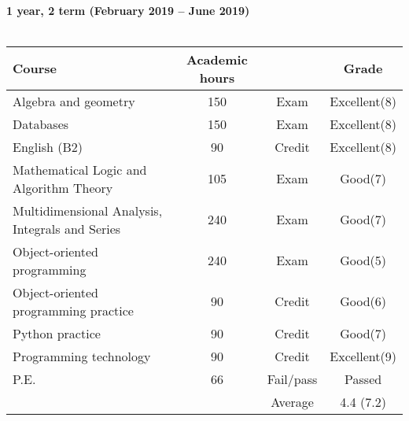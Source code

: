 \documentclass[11pt, a4paper]{report}
\begin{document}
\\ \\
\\
\textbf{1 year, 2 term (February 2019 -- June 2019)}\\ \\
\begin{tabular}{|p{8cm}|c|c|c|}
\hline
\textbf{Course}&\textbf{Academic hours}& &\textbf{Grade}\\
\hline
Algebra and geometry & 150 & Exam & Excellent(8)\\
Databases & 150& Exam & Excellent(8)\\
English (B2) & 90 & Credit & Excellent(8)\\
Mathematical Logic and Algorithm Theory & 105 & Exam & Good(7)\\
Multidimensional Analysis, Integrals and Series & 240 & Exam & Good(7)\\
Object-oriented programming & 240 & Exam & Good(5)\\
Object-oriented programming practice & 90 & Credit & Good(6)\\
Python practice & 90 & Credit & Good(7)\\
Programming technology & 90 & Credit & Excellent(9)\\
P.E. & 66 & Fail/pass & Passed \\
\hline
&& Average & 4.4 (7.2)\\
\hline
\end{tabular}
\clearpage
\end{document}
